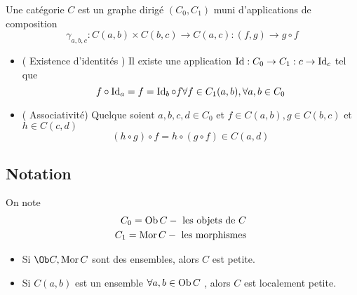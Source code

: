\documentclass[../main.tex]{subfiles}
\begin{document}
\begin{defn}[Catégories]
	Une catégorie $C$ est un graphe dirigé $( C_0, C_1) $ muni d'applications de composition
	\[ 
		\gamma_{a,b,c} : C( a,b) \times C( b,c) \to C( a,c) : ( f,g) \to g\circ f
	\]
\begin{itemize}
	\item ( Existence d'identités ) Il existe une application $\operatorname{Id}: C_0 \to C_1: c \to \operatorname{Id}_c$ tel que
		\[ 
			f\circ \operatorname{Id}_a = f = \operatorname{Id}_b \circ f \forall f \in C_1( a,b) , \forall a,b \in C_0
		\]
	
	\item ( Associativité) Quelque soient $a,b,c,d \in C_0$ et $f \in C( a,b) , g \in C( b,c) $ et $h \in C( c,d) $ 
		\[ 
			( h \circ g) \circ f = h \circ ( g \circ f)  \in C( a,d) 
		\]

\end{itemize}
\end{defn}
\subsection*{Notation}
On note
\begin{align*}
C_0 = \operatorname{Ob} C - \text{ les objets de $C$  } \\
C_1 = \operatorname{Mor} C - \text{ les morphismes } 
\end{align*}
\begin{itemize}
\item Si $\Ob C, \mor C	$  sont des ensembles, alors $C$ est petite.
\item Si $C( a,b) $ est un ensemble $\forall a, b \in \operatorname{Ob} C$ , alors $C$ est localement petite.	
\end{itemize}
\end{document}
